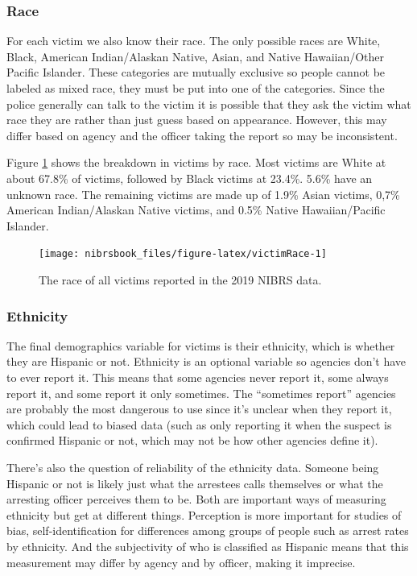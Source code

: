 \documentclass[
  12pt,
  openany]{book}
\begin{document}
\hypertarget{race-1}{%
\subsubsection{Race}\label{race-1}}

For each victim we also know their race. The only possible races are White, Black, American Indian/Alaskan Native, Asian, and Native Hawaiian/Other Pacific Islander. These categories are mutually exclusive so people cannot be labeled as mixed race, they must be put into one of the categories. Since the police generally can talk to the victim it is possible that they ask the victim what race they are rather than just guess based on appearance. However, this may differ based on agency and the officer taking the report so may be inconsistent.

Figure \ref{fig:victimRace} shows the breakdown in victims by race. Most victims are White at about 67.8\% of victims, followed by Black victims at 23.4\%. 5.6\% have an unknown race. The remaining victims are made up of 1.9\% Asian victims, 0,7\% American Indian/Alaskan Native victims, and 0.5\% Native Hawaiian/Pacific Islander.

\begin{figure}

{\centering \texttt{[image: nibrsbook\_files/figure-latex/victimRace-1]} 

}

\caption{The race of all victims reported in the 2019 NIBRS data.}\label{fig:victimRace}
\end{figure}

\hypertarget{ethnicity}{%
\subsubsection{Ethnicity}\label{ethnicity}}

The final demographics variable for victims is their ethnicity, which is whether they are Hispanic or not. Ethnicity is an optional variable so agencies don't have to ever report it. This means that some agencies never report it, some always report it, and some report it only sometimes. The ``sometimes report'' agencies are probably the most dangerous to use since it's unclear when they report it, which could lead to biased data (such as only reporting it when the suspect is confirmed Hispanic or not, which may not be how other agencies define it).

There's also the question of reliability of the ethnicity data. Someone being Hispanic or not is likely just what the arrestees calls themselves or what the arresting officer perceives them to be. Both are important ways of measuring ethnicity but get at different things. Perception is more important for studies of bias, self-identification for differences among groups of people such as arrest rates by ethnicity. And the subjectivity of who is classified as Hispanic means that this measurement may differ by agency and by officer, making it imprecise.
\end{document}

